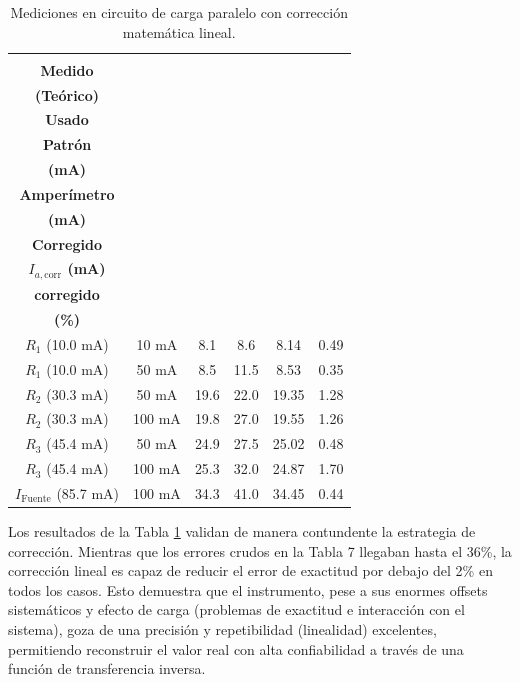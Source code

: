 \begin{table}[h!]
    \centering
    \caption{Mediciones en circuito de carga paralelo con corrección matemática lineal.}
    \label{tab:paralelo_corr3}
    \begin{tabular}{cccccc}
        \toprule
        \makecell{\textbf{Elemento}\\\textbf{Medido}\\\textbf{(Teórico)}} &
        \makecell{\textbf{Rango}\\\textbf{Usado}} &
        \makecell{\textbf{Corriente}\\\textbf{Patrón}\\\textbf{(mA)}} &
        \makecell{\textbf{Lectura}\\\textbf{Amperímetro}\\\textbf{(mA)}} &
        \makecell{\textbf{Valor}\\\textbf{Corregido}\\\textbf{$I_{a,\text{corr}}$ (mA)}} &
        \makecell{\textbf{Error}\\\textbf{corregido}\\\textbf{(\%)}} \\
        \midrule
        $R_1$ (10.0 mA) & 10 mA  & 8.1  & 8.6  & 8.14  & 0.49 \\
        $R_1$ (10.0 mA) & 50 mA  & 8.5  & 11.5 & 8.53  & 0.35 \\
        \midrule
        $R_2$ (30.3 mA) & 50 mA  & 19.6 & 22.0 & 19.35 & 1.28 \\
        $R_2$ (30.3 mA) & 100 mA & 19.8 & 27.0 & 19.55 & 1.26 \\
        \midrule
        $R_3$ (45.4 mA) & 50 mA  & 24.9 & 27.5 & 25.02 & 0.48 \\
        $R_3$ (45.4 mA) & 100 mA & 25.3 & 32.0 & 24.87 & 1.70 \\
        \midrule
        $I_{\text{Fuente}}$ (85.7 mA) & 100 mA & 34.3 & 41.0 & 34.45 & 0.44 \\
        \bottomrule
    \end{tabular}
\end{table}

Los resultados de la Tabla \ref{tab:paralelo_corr3} validan de manera contundente la estrategia de corrección. Mientras que los errores crudos en la Tabla 7 llegaban hasta el 36\%, la corrección lineal es capaz de reducir el error de exactitud por debajo del 2\% en todos los casos. Esto demuestra que el instrumento, pese a sus enormes offsets sistemáticos y efecto de carga (problemas de exactitud e interacción con el sistema), goza de una precisión y repetibilidad (linealidad) excelentes, permitiendo reconstruir el valor real con alta confiabilidad a través de una función de transferencia inversa.





